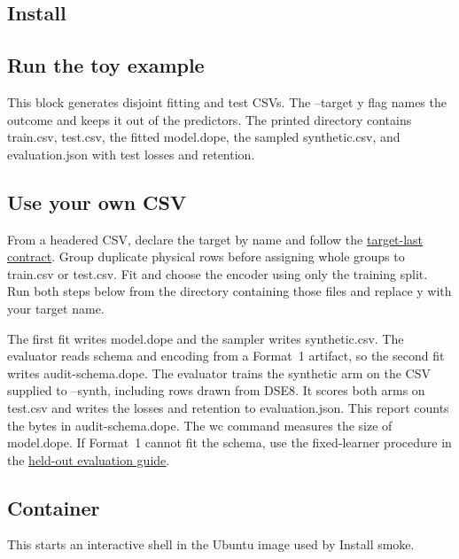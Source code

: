 \documentclass[10pt,letterpaper,twocolumn]{article}
\newcommand{\quickstartfile}[1]{%
  \par\begingroup\footnotesize
  \endgroup\par}
\newcommand{\cli}[1]{{\ttfamily\fontsize{8.9}{11}\selectfont #1}}
\begin{document}
\subsection{Install}
\quickstartfile{examples/install.bash}

\subsection{Run the toy example}
This block generates disjoint fitting and test CSVs. The \cli{--target y} flag names the outcome and keeps it out of the predictors. The printed directory contains \cli{train.csv}, \cli{test.csv}, the fitted \cli{model.dope}, the sampled \cli{synthetic.csv}, and \cli{evaluation.json} with test losses and retention.
\quickstartfile{examples/toy-run.bash}

\subsection{Use your own CSV}
From a headered CSV, declare the target by name and follow the \href{https://github.com/neverhuman/dope/blob/main/docs/data-contract.md}{target-last contract}. Group duplicate physical rows before assigning whole groups to \cli{train.csv} or \cli{test.csv}. Fit and choose the encoder using only the training split. Run both steps below from the directory containing those files and replace \cli{y} with your target name.
\quickstartfile{examples/own-csv.bash}

\noindent The first fit writes \cli{model.dope} and the sampler writes \cli{synthetic.csv}. The  evaluator reads schema and encoding from a Format~1 artifact, so the second fit writes \cli{audit-schema.dope}. The evaluator trains the synthetic arm on the CSV supplied to \cli{--synth}, including rows drawn from \cli{DSE8}. It scores both arms on \cli{test.csv} and writes the losses and retention to \cli{evaluation.json}. This report counts the bytes in \cli{audit-schema.dope}. The \cli{wc} command measures the size of \cli{model.dope}. If Format~1 cannot fit the schema, use the fixed-learner procedure in the \href{https://github.com/neverhuman/dope/blob/main/docs/getting-started.md\#evaluate-the-synthetic-csv}{held-out evaluation guide}.

\subsection{Container}
This starts an interactive shell in the Ubuntu image used by Install smoke.
\quickstartfile{examples/docker.bash}
\twocolumn
\end{document}
